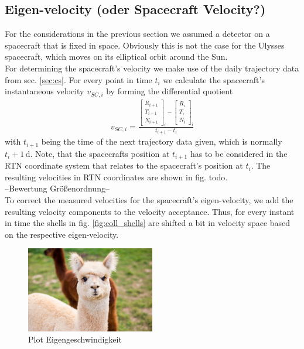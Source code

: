 \subsection{Eigen-velocity (oder Spacecraft Velocity?)}
For the considerations in the previous section we assumed a detector on a spacecraft that is fixed in space. Obviously this is not the case for the Ulysses spacecraft,  which moves on its elliptical orbit around the Sun. \\
For determining the spacecraft's velocity we make use of the daily trajectory data from sec. \ref{sec:cs}. For every point in time $t_i$ we calculate the spacecraft's instantaneous velocity $v_{SC,i}$ by forming the differential quotient 
\begin{align*}
v_{SC,i} = \frac{ \begin{bmatrix}R_{i+1}\\T_{i+1}\\N_{i+1}\end{bmatrix}_i  - \begin{bmatrix}R_{i}\\T_{i}\\N_{i}\end{bmatrix}_i} {t_{i+1} - t_i}
\end{align*}
with $t_{i+1}$ being the time of the next trajectory data given, which is normally $t_i + 1\,\mathrm{d}$. Note, that the spacecrafts position at $t_{i+1}$ has to be considered in the RTN coordinate system that relates to the spacecraft's position at $t_i$. The resulting velocities in RTN coordinates are shown in fig. todo.
\\
--Bewertung Größenordnung--
\\
To correct the measured velocities for the spacecraft's eigen-velocity, we add the resulting velocity components to the velocity acceptance. Thus, for every instant in time the shells in fig. \ref{fig:coll_shells} are shifted a bit in velocity space based on the respective eigen-velocity.

\begin{figure}[h]
	\includegraphics[width=0.5\textwidth]{Figures/dummy.jpg}
	\centering
	\caption{Plot Eigengeschwindigkeit}
	\label{fig:eigenv}
\end{figure}


